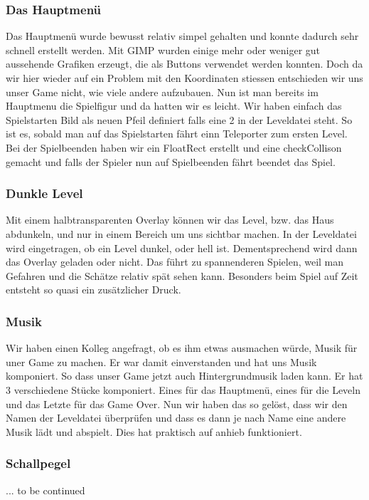 \documentclass[12pt,a4paper]{scrartcl}
\begin{document}
\subsubsection{Das Hauptmenü}
Das Hauptmenü wurde bewusst relativ simpel gehalten und konnte dadurch sehr schnell erstellt werden. Mit GIMP wurden
einige mehr oder weniger gut aussehende Grafiken erzeugt, die als Buttons verwendet werden konnten. Doch da wir hier wieder auf ein Problem mit den Koordinaten stiessen entschieden wir uns unser Game nicht, wie viele andere aufzubauen. Nun ist man bereits im Hauptmenu die Spielfigur  und da hatten wir es leicht. Wir haben einfach das Spielstarten Bild als neuen Pfeil definiert falls eine 2 in der Leveldatei steht. So ist es, sobald man auf das Spielstarten fährt einn Teleporter zum ersten Level. Bei der Spielbeenden haben wir ein FloatRect erstellt und eine checkCollison gemacht und falls der Spieler nun auf Spielbeenden fährt beendet das Spiel. 


\subsubsection{Dunkle Level}
Mit einem halbtransparenten Overlay können wir das Level, bzw. das Haus abdunkeln, und nur in einem Bereich um uns
sichtbar machen. In der Leveldatei wird eingetragen, ob ein Level dunkel, oder hell ist. Dementsprechend wird dann das
Overlay geladen oder nicht. Das führt zu spannenderen Spielen, weil man Gefahren und die Schätze relativ spät sehen kann.
Besonders beim Spiel auf Zeit entsteht so quasi ein zusätzlicher Druck.

\subsubsection{Musik}
Wir haben einen Kolleg angefragt, ob es ihm etwas ausmachen würde, Musik für uner Game zu machen. Er war damit einverstanden und hat uns Musik komponiert. So dass unser Game jetzt auch Hintergrundmusik laden kann. Er hat 3 verschiedene Stücke komponiert. Eines für das Hauptmenü, eines für die Leveln und das Letzte für das Game Over. Nun wir haben das so gelöst, dass wir den Namen der Leveldatei überprüfen und dass es dann je nach Name eine andere Musik lädt und abspielt. Dies hat praktisch auf anhieb funktioniert.

\subsubsection{Schallpegel}
... to be continued
\end{document}
